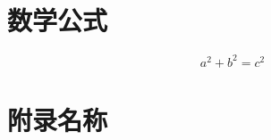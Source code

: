 \documentclass[a4paper,utf8]{ctexart}
\begin{document}

\section{数学公式}
\begin{equation}
    a^2+b^2=c^2
\end{equation}

\appendix

\section{附录名称}
\end{document}
